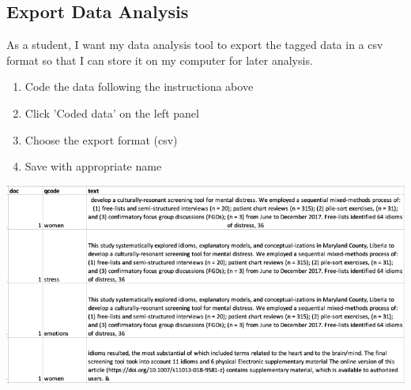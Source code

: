 \documentclass{article}
\begin{document}
\subsection{Export Data Analysis}
As a student, I want my data analysis tool to export the tagged data in a csv format so that I can store it on my computer for later analysis. 
\begin{enumerate}
    \item Code the data following the instructiona above
    \item Click 'Coded data' on the left panel 
    \item Choose the export format (csv)
    \item Save with appropriate name 
\end{enumerate}
\includegraphics[width=\textwidth]{data-analysis-csv.png}
\end{document}
